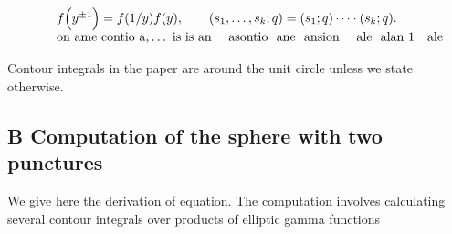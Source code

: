 \documentclass{article}
\begin{document}
\begin{equation}
\begin{array} { r l } & { \quad f \Big ( y ^ { \pm 1 } \Big ) = f ( 1 / y ) f ( y ), \qquad ( s _ { 1 }, \dots, s _ { k } ; q ) = ( s _ { 1 } ; q ) \cdots \cdot ( s _ { k } ; q ). } \\ & { \quad \mathrm { o n ~ a m e ~ c o n t i o ~ a, \dots ~ i s ~ i s ~ a n ~ ~ ~ ~ a s o n t i o ~ ~ a n e ~ ~ a n s i o n ~ ~ ~ ~ a l e ~ ~ a l a n ~ 1 ~ ~ ~ a l e}}\end{array}
\end{equation}


Contour integrals in the paper are around the unit circle unless we state
otherwise.


\subsection*{B  Computation of the sphere with two punctures}


We give here the derivation of equation. The computation involves calculating several contour integrals over products of elliptic gamma functions
\end{document}

